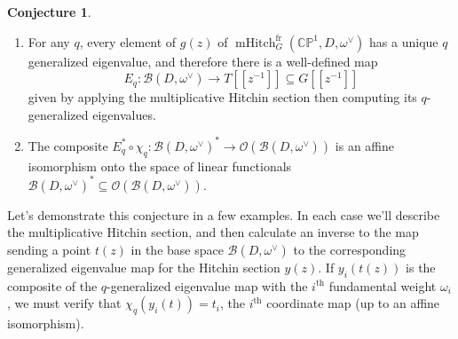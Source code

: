 \documentclass[11pt, oneside, reqno]{amsart}
\theoremstyle{definition} \newtheorem{definition}{Definition}[section]
\newtheorem{conjecture}[definition]{Conjecture}
\theoremstyle{definition} \newtheorem{remark}[definition]{Remark}
\theoremstyle{definition} \newtheorem{remarks}[definition]{Remarks}
\theoremstyle{definition} \newtheorem{question}[definition]{Question}
\theoremstyle{definition} \newtheorem*{note}{Note}
\theoremstyle{definition} \newtheorem{example}[definition]{Example}
\theoremstyle{definition} \newtheorem{examples}[definition]{Examples}
\newcommand{\bb}[1]{\mathbb{#1}}
\newcommand{\mc}[1]{\mathcal{#1}}
\newcommand{\OO}{\mathcal{O}}
\newcommand{\sub}{\subseteq}
\DeclareMathOperator{\mhitch}{mHitch}
\newcommand{\fr}{\mathrm{fr}}
\begin{document}
\begin{conjecture} \label{qchar_conjecture}
\begin{enumerate}
\item For any $q$, every element of $g(z)$ of $\mhitch^\fr_G(\bb{CP}^1, D, \omega^\vee)$ has a unique $q$ generalized eigenvalue, and therefore there is a well-defined map
\[E_q \colon \mc B(D,\omega^\vee) \to T[[z^{-1}]] \sub G[[z^{-1}]]\]
given by applying the multiplicative Hitchin section then computing its $q$-generalized eigenvalues.  

\item The composite $E_q^* \circ \chi_q \colon \mc B(D,\omega^\vee)^* \to \OO(\mc B(D,\omega^\vee))$ is an affine isomorphism onto the space of linear functionals $\mc B(D,\omega^\vee)^* \sub \OO(\mc B(D,\omega^\vee))$.
\end{enumerate}
\end{conjecture}

Let's demonstrate this conjecture in a few examples.  In each case we'll describe the multiplicative Hitchin section, and then calculate an inverse to the map sending a point $t(z)$ in the base space $\mc B(D,\omega^\vee)$ to the corresponding generalized eigenvalue map for the Hitchin section $y(z)$.  If $y_i(t(z))$ is the composite of the $q$-generalized eigenvalue map with the $i^\text{th}$ fundamental weight $\omega_i$, we must verify that $\chi_q(y_i(t)) = t_i$, the $i^\text{th}$ coordinate map (up to an affine isomorphism).
\end{document}
